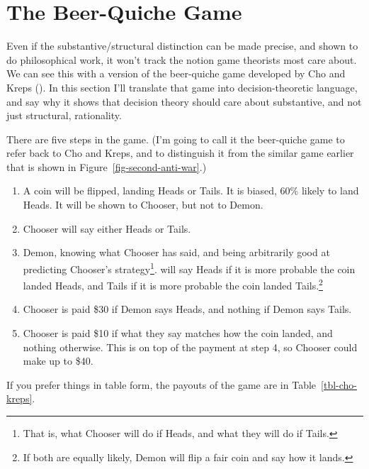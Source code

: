 \documentclass[
  12pt,
  letterpaper,
  DIV=11,
  numbers=noendperiod]{scrreprt}
\providecommand{\tightlist}{%
  \setlength{\itemsep}{0pt}\setlength{\parskip}{0pt}}\usepackage{longtable,booktabs,array}
\begin{document}
\section{The Beer-Quiche Game}\label{sec-beer-quiche}

Even if the substantive/structural distinction can be made precise, and
shown to do philosophical work, it won't track the notion game theorists
most care about. We can see this with a version of the beer-quiche game
developed by Cho and Kreps (). In this
section I'll translate that game into decision-theoretic language, and
say why it shows that decision theory should care about substantive, and
not just structural, rationality.

There are five steps in the game. (I'm going to call it the beer-quiche
game to refer back to Cho and Kreps, and to distinguish it from the
similar game earlier that is shown in Figure~\ref{fig-second-anti-war}.)

\begin{enumerate}
\def\labelenumi{\arabic{enumi}.}
\tightlist
\item
  A coin will be flipped, landing Heads or Tails. It is biased, 60\%
  likely to land Heads. It will be shown to Chooser, but not to Demon.
\item
  Chooser will say either Heads or Tails.
\item
  Demon, knowing what Chooser has said, and being arbitrarily good at
  predicting Chooser's strategy\footnote{That is, what Chooser will do
    if Heads, and what they will do if Tails.}. will say Heads if it is
  more probable the coin landed Heads, and Tails if it is more probable
  the coin landed Tails.\footnote{If both are equally likely, Demon will
    flip a fair coin and say how it lands.}
\item
  Chooser is paid \$30 if Demon says Heads, and nothing if Demon says
  Tails.
\item
  Chooser is paid \$10 if what they say matches how the coin landed, and
  nothing otherwise. This is on top of the payment at step 4, so Chooser
  could make up to \$40.
\end{enumerate}

If you prefer things in table form, the payouts of the game are in
Table~\ref{tbl-cho-kreps}.
\end{document}
